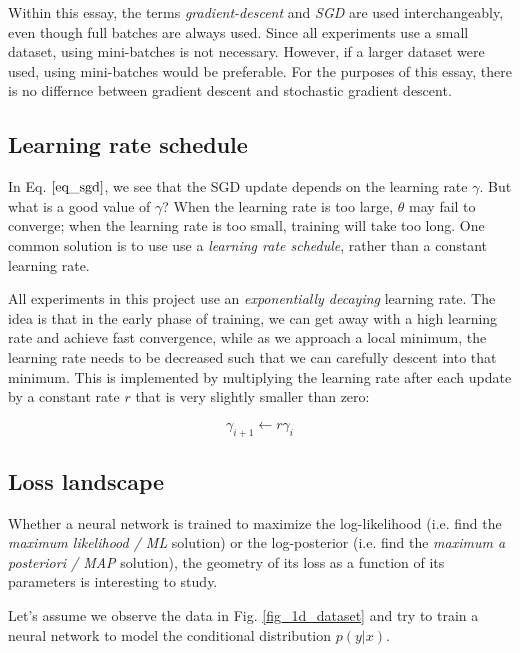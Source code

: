 \documentclass[12pt]{article}
\begin{document}
Within this essay, the terms \textit{gradient-descent} and \textit{SGD} are used interchangeably, even though full batches are always used. Since all experiments use a small dataset, using mini-batches is not necessary. However, if a larger dataset were used, using mini-batches would be preferable. For the purposes of this essay, there is no differnce between gradient descent and stochastic gradient descent. 

\subsection{Learning rate schedule}

In Eq. $\ref{eq_sgd}$, we see that the SGD update depends on the learning rate $\gamma$. But what is a good value of $\gamma$? When the learning rate is too large, $\theta$ may fail to converge; when the learning rate is too small, training will take too long. One common solution is to use use a \textit{learning rate schedule}, rather than a constant learning rate.

All experiments in this project use an \textit{exponentially decaying} learning rate. The idea is that in the early phase of training, we can get away with a high learning rate and achieve fast convergence, while as we approach a local minimum, the learning rate needs to be decreased such that we can carefully descent into that minimum. This is implemented by multiplying the learning rate after each update by a constant rate $r$ that is very slightly smaller than zero:

\begin{equation}
\gamma_{i+1} \leftarrow r \gamma_i
\end{equation}

\subsection{Loss landscape}
\label{sec_loss_landscape}

Whether a neural network is trained to maximize the log-likelihood (i.e. find the \textit{maximum likelihood / ML} solution) or the log-posterior (i.e. find the \textit{maximum a posteriori / MAP} solution), the geometry of its loss as a function of its parameters is interesting to study.

Let's assume we observe the data in Fig. \ref{fig_1d_dataset} and try to train a neural network to model the conditional distribution $p(y | x)$.
\end{document}
